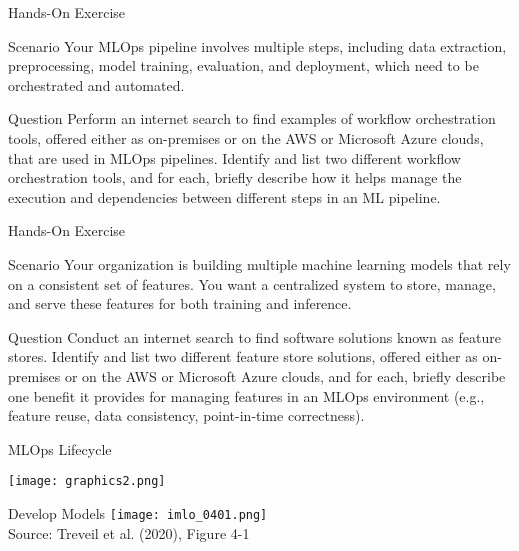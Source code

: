 \documentclass[ignorenonframetext,xcolor=x11names]{beamer}
\begin{document}
\begin{frame}{Hands-On Exercise}

\begin{block}{Scenario}
Your MLOps pipeline involves multiple steps, including data extraction, preprocessing, model training, evaluation, and deployment, which need to be orchestrated and automated.
\end{block}

\begin{block}{Question}
Perform an internet search to find examples of workflow orchestration tools, offered either as on-premises or on the AWS or Microsoft Azure clouds, that are used in MLOps pipelines. Identify and list two different workflow orchestration tools, and for each, briefly describe how it helps manage the execution and dependencies between different steps in an ML pipeline.
\end{block}
\end{frame}

\begin{frame}{Hands-On Exercise}

\begin{block}{Scenario}
Your organization is building multiple machine learning models that rely on a consistent set of features. You want a centralized system to store, manage, and serve these features for both training and inference.
\end{block}

\begin{block}{Question}
Conduct an internet search to find software solutions known as feature stores. Identify and list two different feature store solutions, offered either as on-premises or on the AWS or Microsoft Azure clouds, and for each, briefly describe one benefit it provides for managing features in an MLOps environment (e.g., feature reuse, data consistency, point-in-time correctness).
\end{block}
\end{frame}


\begin{frame}{MLOps Lifecycle}
\centering

\texttt{[image: graphics2.png]} \\
\end{frame}


\begin{frame}{Develop Models}
\centering
\texttt{[image: imlo\_0401.png]} \\

\vspace{\baselineskip}
\scriptsize Source: Treveil et al. (2020), Figure 4-1
\end{frame}
\end{document}

